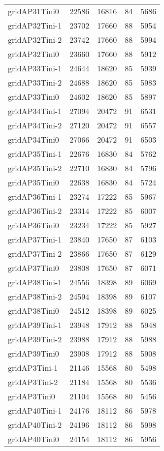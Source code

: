 \begin{longtable}{lrrrr}
gridAP31Tini0 & 22586 & 16816 & 84 & 5686 \\
gridAP32Tini-1 & 23702 & 17660 & 88 & 5954 \\
gridAP32Tini-2 & 23742 & 17660 & 88 & 5994 \\
gridAP32Tini0 & 23660 & 17660 & 88 & 5912 \\
gridAP33Tini-1 & 24644 & 18620 & 85 & 5939 \\
gridAP33Tini-2 & 24688 & 18620 & 85 & 5983 \\
gridAP33Tini0 & 24602 & 18620 & 85 & 5897 \\
gridAP34Tini-1 & 27094 & 20472 & 91 & 6531 \\
gridAP34Tini-2 & 27120 & 20472 & 91 & 6557 \\
gridAP34Tini0 & 27066 & 20472 & 91 & 6503 \\
gridAP35Tini-1 & 22676 & 16830 & 84 & 5762 \\
gridAP35Tini-2 & 22710 & 16830 & 84 & 5796 \\
gridAP35Tini0 & 22638 & 16830 & 84 & 5724 \\
gridAP36Tini-1 & 23274 & 17222 & 85 & 5967 \\
gridAP36Tini-2 & 23314 & 17222 & 85 & 6007 \\
gridAP36Tini0 & 23234 & 17222 & 85 & 5927 \\
gridAP37Tini-1 & 23840 & 17650 & 87 & 6103 \\
gridAP37Tini-2 & 23866 & 17650 & 87 & 6129 \\
gridAP37Tini0 & 23808 & 17650 & 87 & 6071 \\
gridAP38Tini-1 & 24556 & 18398 & 89 & 6069 \\
gridAP38Tini-2 & 24594 & 18398 & 89 & 6107 \\
gridAP38Tini0 & 24512 & 18398 & 89 & 6025 \\
gridAP39Tini-1 & 23948 & 17912 & 88 & 5948 \\
gridAP39Tini-2 & 23988 & 17912 & 88 & 5988 \\
gridAP39Tini0 & 23908 & 17912 & 88 & 5908 \\
gridAP3Tini-1 & 21146 & 15568 & 80 & 5498 \\
gridAP3Tini-2 & 21184 & 15568 & 80 & 5536 \\
gridAP3Tini0 & 21104 & 15568 & 80 & 5456 \\
gridAP40Tini-1 & 24176 & 18112 & 86 & 5978 \\
gridAP40Tini-2 & 24196 & 18112 & 86 & 5998 \\
gridAP40Tini0 & 24154 & 18112 & 86 & 5956 \\

\end{longtable}

